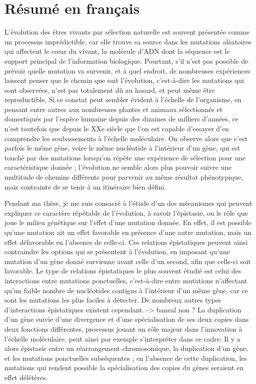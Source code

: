 
\chapter{Résumé en français}

L'évolution des êtres vivants par sélection naturelle est souvent présentée comme un processus imprédictible, car elle trouve sa source dans les mutations aléatoires qui affectent le cœur du vivant, la molécule d'ADN dont la séquence est le support principal de l'information biologique.
Pourtant, s'il n'est pas possible de prévoir quelle mutation va survenir, et à quel endroit, de nombreuses expériences laissent penser que le chemin que suit l'évolution, c'est-à-dire les mutations qui sont observées, n'est pas totalement dû au hasard, et peut même être reproductible.
Si ce constat peut sembler évident à l'échelle de l'organisme, en pensant entre autres aux nombreuses plantes et animaux sélectionnés et domestiqués par l'espèce humaine depuis des dizaines de milliers d'années, ce n'est toutefois que depuis le XXe siècle que l'on est capable d'essayer d'en comprendre les soubassements à l'échelle moléculaire.
On observe alors que c'est parfois le même gène, voire le même nucléotide à l'intérieur d'un gène, qui est touché par des mutations lorsqu'on répète une expérience de sélection pour une caractéristique donnée ; l'évolution ne semble alors plus pouvoir suivre une multitude de chemins différents pour parvenir au même résultat phénotypique, mais contrainte de se tenir à un itinéraire bien défini.

Pendant ma thèse, je me suis consacré à l'étude d'un des mécanismes qui peuvent expliquer ce caractère répétable de l'évolution, à savoir l'épistasie, ou le rôle que joue le milieu génétique sur l'effet d'une mutation donnée.
En effet, il est possible qu'une mutation ait un effet favorable en présence d'une autre mutation, mais un effet défavorable en l'absence de celle-ci.
Ces relations épistatiques peuvent ainsi contraindre les options qui se présentent à l'évolution, en imposant qu'une mutation d'un gène donné survienne avant celle d'un second, afin que celle-ci soit favorable.
Le type de relations épistatiques le plus souvent étudié est celui des interactions entre mutations ponctuelles, c'est-à-dire entre mutations n'affectant qu'un faible nombre de nucléotides contigus à l'intérieur d'un même gène, car ce sont les mutations les plus faciles à détecter.
De nombreux autres types d'interactions épistatiques existent cependant. -> bancal non ?
La duplication d'un gène suivie d'une divergence et d'une spécialisation de ses deux copies dans deux fonctions différentes, processus jouant un rôle majeur dans l'innovation à l'échelle moléculaire, peut ainsi par exemple s'interpréter dans ce cadre.
Il y a alors épistasie entre un réarrangement chromosomique, la duplication d'un gène, et les mutations ponctuelles subséquentes ; en l'absence de cette duplication, les mutations qui rendent possible la spécialisation des copies du gènes seraient en effet délétères.

